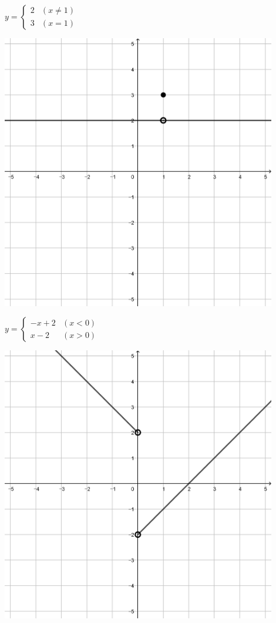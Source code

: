 \documentclass[a4paper]{oblivoir}
\begin{document}
\begin{minipage}{0.45\textwidth}\centering
\(y=\begin{cases}2&(x\neq1)\\3&(x=1)\end{cases}\)
\par\bigskip\includegraphics[width=0.9\textwidth]{img/3_piecewise_11}
\end{minipage}
\begin{minipage}{0.45\textwidth}\centering
\(y=\begin{cases}-x+2&(x<0)\\x-2&(x>0)\end{cases}\)
\par\bigskip\includegraphics[width=0.9\textwidth]{img/3_piecewise_12}
\end{minipage}\bigskip\bigskip\par
\end{document}
